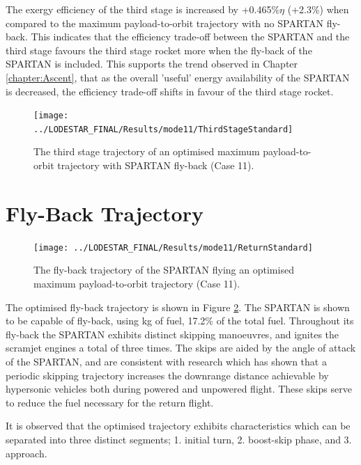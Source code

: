The exergy efficiency of the third stage is increased by +0.465\%$\eta$ (+2.3\%) when compared to the maximum payload-to-orbit trajectory with no SPARTAN fly-back. This indicates that the efficiency trade-off between the SPARTAN and the third stage favours the third stage rocket more when the fly-back of the SPARTAN is included. This supports the trend observed in Chapter \ref{chapter:Ascent}, that as the overall 'useful' energy availability of the SPARTAN is decreased, the efficiency trade-off shifts in favour of the third stage rocket.  


\begin{figure}[ht!]
\centering
\texttt{[image: ../LODESTAR\_FINAL/Results/mode11/ThirdStageStandard]}
\caption{The third stage trajectory of an optimised maximum payload-to-orbit trajectory with SPARTAN fly-back (Case 11). }
\label{fig:ThirdStageStandard}
\end{figure}


\section{Fly-Back Trajectory}

\begin{figure}[ht!]
	\centering
	\texttt{[image: ../LODESTAR\_FINAL/Results/mode11/ReturnStandard]}
	\caption{The fly-back trajectory of the SPARTAN flying an optimised maximum payload-to-orbit trajectory (Case 11). }
	\label{fig:ReturnStandard}
\end{figure}

The optimised fly-back trajectory is shown in Figure \ref{fig:ReturnStandard}.
The SPARTAN is shown to be capable of fly-back, using \returnFuelStandard kg of fuel, 17.2\% of the total fuel.
Throughout its fly-back the SPARTAN exhibits distinct skipping manoeuvres, and ignites the scramjet engines a total of three times. 
The skips are aided by the angle of attack of the SPARTAN, and are consistent with research which has shown that a periodic skipping trajectory increases the downrange distance achievable by hypersonic vehicles both during powered and unpowered flight\cite{Eggers1957,Kanda2007}. These skips serve to reduce the fuel necessary for the return flight. 

It is observed that the optimised trajectory exhibits characteristics which can be separated into three distinct segments; 1. initial turn, 2. boost-skip phase, and 3. approach. 
 
